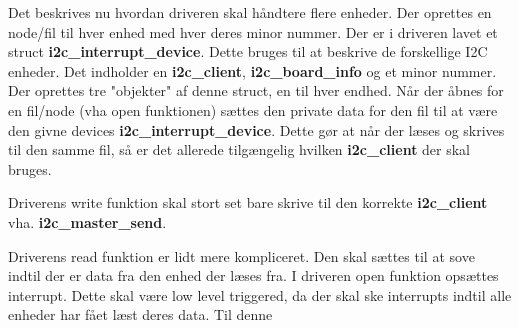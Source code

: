 \documentclass[Softwaredesign/Softwaredesign_main.tex]{subfiles}
\begin{document}
Det beskrives nu hvordan driveren skal håndtere flere enheder. Der oprettes en node/fil til hver enhed med hver deres minor nummer.
Der er i driveren lavet et struct \textbf{i2c\_interrupt\_device}. Dette bruges til at beskrive de forskellige I2C enheder. Det indholder en \textbf{i2c\_client}, \textbf{i2c\_board\_info} og et minor nummer. Der oprettes tre "objekter" af denne struct, en til hver endhed. Når der åbnes for en fil/node (vha open funktionen) sættes den private data for den fil til at være den givne devices \textbf{i2c\_interrupt\_device}. Dette gør at når der læses og skrives til den samme fil, så er det allerede tilgængelig hvilken \textbf{i2c\_client} der skal bruges.

Driverens write funktion skal stort set bare skrive til den korrekte \textbf{i2c\_client} vha. \textbf{i2c\_master\_send}.

Driverens read funktion er lidt mere kompliceret. Den skal sættes til at sove indtil der er data fra den enhed der læses fra. I driveren open funktion opsættes interrupt. Dette skal være low level triggered, da der skal ske interrupts indtil alle enheder har fået læst deres data. Til denne 
\end{document}
